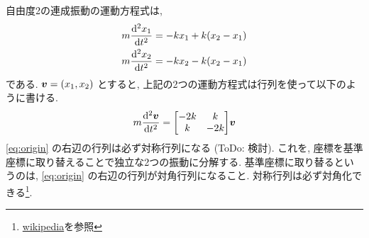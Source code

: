 \documentclass[a4paper,12pt,uplatex]{jsarticle}
\begin{document}
自由度2の連成振動の運動方程式は,
\begin{align}
    m \dv[2]{x_1}{t} &= -kx_1 + k(x_2 - x_1) \\
    m \dv[2]{x_2}{t} &= -kx_2 - k(x_2 - x_1)
\end{align}
である. $\vb*{v} = \qty(x_1, x_2)$ とすると, 上記の2つの運動方程式は行列を使って以下のように書ける.
\begin{equation}
    \label{eq:origin}
    m \dv[2]{\vb*{v}}{t}
    =
    \mqty[-2k & k \\ k & -2k] \vb*{v}
\end{equation}
\eqref{eq:origin} の右辺の行列は必ず対称行列になる (ToDo: 検討). 
これを, 座標を基準座標に取り替えることで独立な2つの振動に分解する. 基準座標に取り替るというのは, \eqref{eq:origin} の右辺の行列が対角行列になること. 対称行列は必ず対角化できる\footnote{\href{https://ja.wikipedia.org/wiki/\%E5\%AF\%BE\%E7\%A7\%B0\%E8\%A1\%8C\%E5\%88\%97}{wikipedia}を参照}. 
\end{document}
